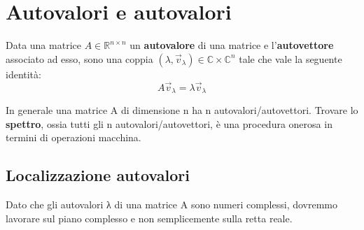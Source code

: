 \chapter{Autovalori e autovalori}
\begin{definizione} 
    Data una matrice $A \in \mathbb{R}^{n\times n}$ un \textbf{autovalore} di una
    matrice e l'\textbf{autovettore} associato ad esso, sono una coppia $(\lambda,
        \vec{v}_\lambda)\in \mathbb{C}\times\mathbb{C}^{n}$ tale che vale la
    seguente identità:
    \begin{equation*}
        A\vec{v}_\lambda = \lambda \vec{v}_\lambda
    \end{equation*}
\end{definizione}
In generale una matrice A di dimensione n ha n autovalori/autovettori. Trovare
lo \textbf{spettro}, ossia tutti gli n autovalori/autovettori, è una procedura
onerosa in termini di operazioni macchina.
\section{Localizzazione autovalori}
Dato che gli autovalori λ di una matrice A sono numeri complessi, dovremmo
lavorare sul piano complesso e non semplicemente sulla retta reale.

